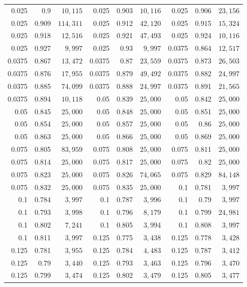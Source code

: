 \begin{singlespace}
\begin{longtable}{@{}rrr@{\hspace{2.2em}}rrr@{\hspace{2.2em}}rrr@{}}
0.025 & 0.9 & $10{,}115$ & 0.025 & 0.903 & $10{,}116$ & 0.025 & 0.906 & $23{,}156$ \\
0.025 & 0.909 & $114{,}311$ & 0.025 & 0.912 & $42{,}120$ & 0.025 & 0.915 & $15{,}324$ \\
0.025 & 0.918 & $12{,}516$ & 0.025 & 0.921 & $47{,}493$ & 0.025 & 0.924 & $10{,}116$ \\
0.025 & 0.927 & $9{,}997$ & 0.025 & 0.93 & $9{,}997$ & 0.0375 & 0.864 & $12{,}517$ \\
0.0375 & 0.867 & $13{,}472$ & 0.0375 & 0.87 & $23{,}559$ & 0.0375 & 0.873 & $26{,}503$ \\
0.0375 & 0.876 & $17{,}955$ & 0.0375 & 0.879 & $49{,}492$ & 0.0375 & 0.882 & $24{,}997$ \\
0.0375 & 0.885 & $74{,}099$ & 0.0375 & 0.888 & $24{,}997$ & 0.0375 & 0.891 & $21{,}565$ \\
0.0375 & 0.894 & $10{,}118$ & 0.05 & 0.839 & $25{,}000$ & 0.05 & 0.842 & $25{,}000$ \\
0.05 & 0.845 & $25{,}000$ & 0.05 & 0.848 & $25{,}000$ & 0.05 & 0.851 & $25{,}000$ \\
0.05 & 0.854 & $25{,}000$ & 0.05 & 0.857 & $25{,}000$ & 0.05 & 0.86 & $25{,}000$ \\
0.05 & 0.863 & $25{,}000$ & 0.05 & 0.866 & $25{,}000$ & 0.05 & 0.869 & $25{,}000$ \\
0.075 & 0.805 & $83{,}959$ & 0.075 & 0.808 & $25{,}000$ & 0.075 & 0.811 & $25{,}000$ \\
0.075 & 0.814 & $25{,}000$ & 0.075 & 0.817 & $25{,}000$ & 0.075 & 0.82 & $25{,}000$ \\
0.075 & 0.823 & $25{,}000$ & 0.075 & 0.826 & $74{,}065$ & 0.075 & 0.829 & $84{,}148$ \\
0.075 & 0.832 & $25{,}000$ & 0.075 & 0.835 & $25{,}000$ & 0.1 & 0.781 & $3{,}997$ \\
0.1 & 0.784 & $3{,}997$ & 0.1 & 0.787 & $3{,}996$ & 0.1 & 0.79 & $3{,}997$ \\
0.1 & 0.793 & $3{,}998$ & 0.1 & 0.796 & $8{,}179$ & 0.1 & 0.799 & $24{,}981$ \\
0.1 & 0.802 & $7{,}241$ & 0.1 & 0.805 & $3{,}994$ & 0.1 & 0.808 & $3{,}997$ \\
0.1 & 0.811 & $3{,}997$ & 0.125 & 0.775 & $3{,}438$ & 0.125 & 0.778 & $3{,}428$ \\
0.125 & 0.781 & $3{,}955$ & 0.125 & 0.784 & $4{,}483$ & 0.125 & 0.787 & $3{,}412$ \\
0.125 & 0.79 & $3{,}440$ & 0.125 & 0.793 & $3{,}463$ & 0.125 & 0.796 & $3{,}470$ \\
0.125 & 0.799 & $3{,}474$ & 0.125 & 0.802 & $3{,}479$ & 0.125 & 0.805 & $3{,}477$ \\
\end{longtable}
\end{singlespace}
\endgroup
